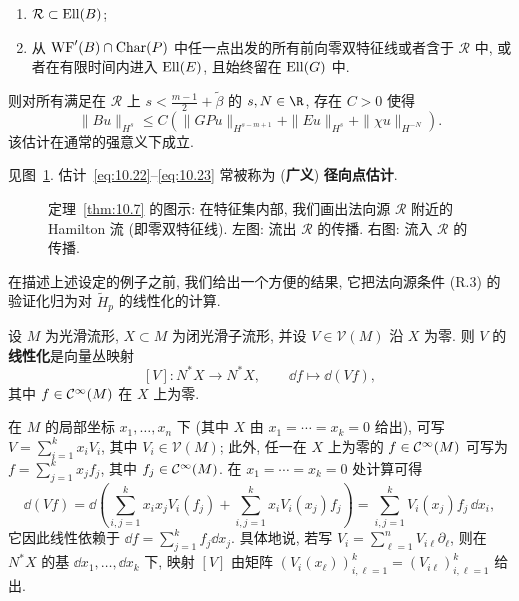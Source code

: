 \begin{theorem}
\begin{enumerate}
\begin{enumerate}
        \item[(iii)] $\mathcal{R} \subset \operatorname{Ell}(B)$;
        \item[(iv)] 从 $\operatorname{WF}'(B) \cap \operatorname{Char}(P)$ 中任一点出发的所有前向零双特征线或者含于 $\mathcal{R}$ 中, 或者在有限时间内进入 $\operatorname{Ell}(E)$, 且始终留在 $\operatorname{Ell}(G)$ 中.
    \end{enumerate}
    则对所有满足在 $\mathcal{R}$ 上 $s < \frac{m-1}{2} + \tilde{\beta}$ 的 $s, N \in \R$, 存在 $C > 0$ 使得
    \begin{equation}\label{eq:10.23}
        \|B u\|_{H^s} \le C \left( \|G P u\|_{H^{s-m+1}} + \|E u\|_{H^s} + \|\chi u\|_{H^{-N}} \right).
    \end{equation}
    该估计在通常的强意义下成立.
\end{enumerate}
\end{theorem}

见图~\ref{fig:10.3}. 估计~\eqref{eq:10.22}--\eqref{eq:10.23} 常被称为 (\textbf{广义}) \textbf{径向点估计}.

\begin{figure}[htbp]
\centering
\drawFigTenThree
\caption{定理~\ref{thm:10.7} 的图示: 在特征集内部, 我们画出法向源 $\mathcal{R}$ 附近的 Hamilton 流 (即零双特征线). 左图: 流出 $\mathcal{R}$ 的传播. 右图: 流入 $\mathcal{R}$ 的传播.}
\label{fig:10.3}
\end{figure}

在描述上述设定的例子之前, 我们给出一个方便的结果, 它把法向源条件 (R.3) 的验证化归为对 $\tilde{H}_p$ 的线性化的计算.

\begin{definition}[向量场的线性化]\label{def:10.8}
设 $M$ 为光滑流形, $X \subset M$ 为闭光滑子流形, 并设 $V \in \mathcal{V}(M)$ 沿 $X$ 为零. 则 $V$ 的\textbf{线性化}是向量丛映射
\begin{equation}\label{eq:10.24}
    [V] \colon N^* X \to N^* X, \qquad \dd f \mapsto \dd(V f),
\end{equation}
其中 $f \in \mathcal{C}^\infty(M)$ 在 $X$ 上为零.
\end{definition}

在 $M$ 的局部坐标 $x_1, \ldots, x_n$ 下 (其中 $X$ 由 $x_1 = \cdots = x_k = 0$ 给出), 可写 $V = \sum_{i=1}^{k} x_i V_i$, 其中 $V_i \in \mathcal{V}(M)$; 此外, 任一在 $X$ 上为零的 $f \in \mathcal{C}^\infty(M)$ 可写为 $f = \sum_{j=1}^{k} x_j f_j$, 其中 $f_j \in \mathcal{C}^\infty(M)$. 在 $x_1 = \cdots = x_k = 0$ 处计算可得
\begin{equation}\label{eq:10.25}
    \dd(V f) = \dd\left( \sum_{i,j=1}^{k} x_i x_j V_i(f_j) + \sum_{i,j=1}^{k} x_i V_i(x_j) f_j \right) = \sum_{i,j=1}^{k} V_i(x_j) f_j \, \dd x_i,
\end{equation}
它因此线性依赖于 $\dd f = \sum_{j=1}^{k} f_j \dd x_j$. 具体地说, 若写 $V_i = \sum_{\ell=1}^{n} V_{i\ell} \partial_\ell$, 则在 $N^* X$ 的基 $\dd x_1, \ldots, \dd x_k$ 下, 映射 $[V]$ 由矩阵 $(V_i(x_\ell))_{i,\ell=1}^{k} = (V_{i\ell})_{i,\ell=1}^{k}$ 给出.

